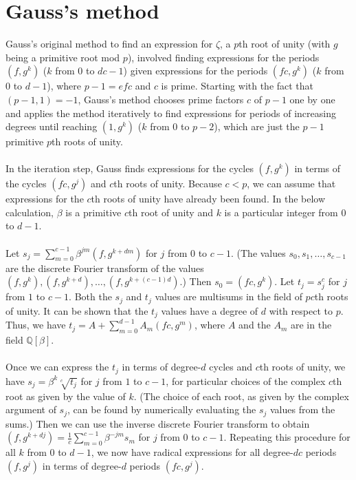 \documentclass{article}
\begin{document}
\section{Gauss's method}
    Gauss's original method to find an expression for $ \zeta $, a $ p $th root of unity (with $ g $ being a primitive root mod $ p $), involved finding expressions for the periods $ (f, g^k) $ ($ k $ from $ 0 $ to $ dc - 1 $) given expressions for the periods $ (fc, g^k) $ ($ k $ from $ 0 $ to $ d - 1 $), where $ p - 1 = efc $ and $ c $ is prime. Starting with the fact that $ (p - 1, 1) = -1 $, Gauss's method chooses prime factors $ c $ of $ p - 1 $ one by one and applies the method iteratively to find expressions for periods of increasing degrees until reaching $ (1, g^k) $ ($ k $ from $ 0 $ to $ p - 2 $), which are just the $ p - 1 $ primitive $ p $th roots of unity.\\
    \\
    In the iteration step, Gauss finds expressions for the cycles $ (f, g^k) $ in terms of the cycles $ (fc, g^j) $ and $ c $th roots of unity. Because $ c < p $, we can assume that expressions for the $ c $th roots of unity have already been found. In the below calculation, $ \beta $ is a primitive $ c $th root of unity and $ k $ is a particular integer from $ 0 $ to $ d - 1 $.\\
    \\
    Let $ s_j = \sum_{m = 0}^{c - 1} \beta^{jm} (f, g^{k + dm}) $ for $ j $ from $ 0 $ to $ c - 1 $. (The values $ s_0, s_1, \dots, s_{c - 1} $ are the discrete Fourier transform of the values $ (f, g^k), (f, g^{k + d}), \dots, (f, g^{k + (c - 1)d}) $.) Then $ s_0 = (fc, g^k) $. Let $ t_j = s_j^c $ for $ j $ from $ 1 $ to $ c - 1 $. Both the $ s_j $ and $ t_j $ values are multisums in the field of $ pc $th roots of unity. It can be shown that the $ t_j $ values have a degree of $ d $ with respect to $ p $. Thus, we have $ t_j = A + \sum_{m = 0}^{d - 1} A_m (fc, g^m) $, where $ A $ and the $ A_m $ are in the field $ \mathbb{Q}[\beta] $.\\
    \\
    Once we can express the $ t_j $ in terms of degree-$ d $ cycles and $ c $th roots of unity, we have $ s_j = \beta^k \sqrt[c]{t_j} $ for $ j $ from $ 1 $ to $ c - 1 $, for particular choices of the complex $ c $th root as given by the value of $ k $. (The choice of each root, as given by the complex argument of $ s_j $, can be found by numerically evaluating the $ s_j $ values from the sums.) Then we can use the inverse discrete Fourier transform to obtain $ (f, g^{k + dj}) = \frac{1}{c} \sum_{m = 0}^{c - 1} \beta^{-jm} s_m $ for $ j $ from $ 0 $ to $ c - 1 $. Repeating this procedure for all $ k $ from $ 0 $ to $ d - 1 $, we now have radical expressions for all degree-$ dc $ periods $ (f, g^j) $ in terms of degree-$ d $ periods $ (fc, g^j) $.\\
\end{document}
